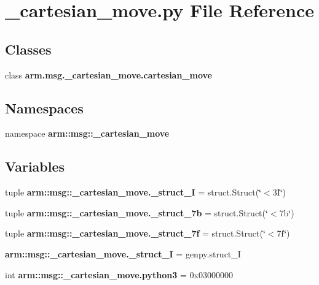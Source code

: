 \section{\-\_\-cartesian\-\_\-move.\-py \-File \-Reference}
\label{__cartesian__move_8py}
\subsection*{\-Classes}
\begin{DoxyCompactItemize}
\item 
class {\bf arm.\-msg.\-\_\-cartesian\-\_\-move.\-cartesian\-\_\-move}
\end{DoxyCompactItemize}
\subsection*{\-Namespaces}
\begin{DoxyCompactItemize}
\item 
namespace {\bf arm\-::msg\-::\-\_\-cartesian\-\_\-move}
\end{DoxyCompactItemize}
\subsection*{\-Variables}
\begin{DoxyCompactItemize}
\item 
tuple {\bf arm\-::msg\-::\-\_\-cartesian\-\_\-move.\-\_\-struct\-\_\-I} = struct.\-Struct(\char`\"{}$<$3\-I\char`\"{})
\item 
tuple {\bf arm\-::msg\-::\-\_\-cartesian\-\_\-move.\-\_\-struct\-\_\-7b} = struct.\-Struct(\char`\"{}$<$7b\char`\"{})
\item 
tuple {\bf arm\-::msg\-::\-\_\-cartesian\-\_\-move.\-\_\-struct\-\_\-7f} = struct.\-Struct(\char`\"{}$<$7f\char`\"{})
\item 
{\bf arm\-::msg\-::\-\_\-cartesian\-\_\-move.\-\_\-struct\-\_\-\-I} = genpy.\-struct\-\_\-\-I
\item 
int {\bf arm\-::msg\-::\-\_\-cartesian\-\_\-move.\-python3} = 0x03000000
\end{DoxyCompactItemize}
